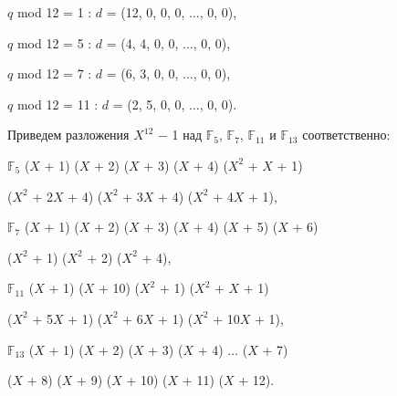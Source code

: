 \begin{flushleft}
\hspace{89pt}$q$ mod 12 = 1 : \hspace{5pt} $d$ = (12, 0, 0, 0, $\dots$, 0, 0), \ 

\vspace{0pt}\hspace{89pt}$q$ mod 12 = 5 : \hspace{5pt} $d$ = (4, 4, 0, 0, $\dots$, 0, 0), \ 

\vspace{0pt}\hspace{89pt}$q$ mod 12 = 7 : \hspace{5pt} $d$ = (6, 3, 0, 0, $\dots$, 0, 0), \ 

\vspace{0pt}\hspace{89pt}$q$ mod 12 = 11 : \hspace{5pt} $d$ = (2, 5, 0, 0, $\dots$, 0, 0).
\end{flushleft}

\noindent Приведем разложения $X^{12}$ $-$ 1 над $\mathbb F_5$, $\mathbb F_7$, $\mathbb F_{11}$ и $\mathbb F_{13}$ соответственно:

\begin{flushleft}
\hspace{60pt} $\mathbb F_{5}$ \hspace{5pt} ($X$ + 1) ($X$ + 2) ($X$ + 3) ($X$ + 4) ($X^{2}$ + $X$ + 1)\ 

\vspace{0pt}\hspace{115pt} ($X^{2}$ + 2$X$ + 4) ($X^{2}$ + 3$X$ + 4) ($X^{2}$ + 4$X$ + 1),\ 

\vspace{0pt}\hspace{60pt} $\mathbb F_{7}$ \hspace{5pt} ($X$ + 1) ($X$ + 2) ($X$ + 3) ($X$ + 4) ($X$ + 5) ($X$ + 6)\ 

\vspace{0pt}\hspace{115pt} ($X^{2}$ + 1) ($X^{2}$ + 2) ($X^{2}$ + 4),\ 

\hspace{55pt} $\mathbb F_{11}$ \hspace{5pt} ($X$ + 1) ($X$ + 10) ($X^{2}$ + 1) ($X^{2}$ + $X$ + 1)\ 

\vspace{0pt}\hspace{115pt} ($X^{2}$ + 5$X$ + 1) ($X^{2}$ + 6$X$ + 1) ($X^{2}$ + 10$X$ + 1),\ 

\hspace{55pt} $\mathbb F_{13}$ \hspace{5pt} ($X$ + 1) ($X$ + 2) ($X$ + 3) ($X$ + 4) $\dots$ ($X$ + 7)\ 

\vspace{0pt}\hspace{115pt} ($X$ + 8) ($X$ + 9) ($X$ + 10) ($X$ + 11) ($X$ + 12).\ 
\end{flushleft}

